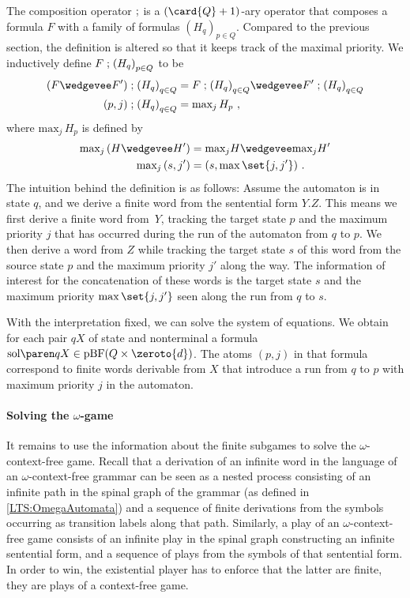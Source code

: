 \documentclass[../../diss.tex]{subfiles}
\begin{document}
The composition operator $\mathrel{;}$ is a $(\card{Q}+1)$-ary operator that composes a formula $F$ with a family of formulas ${(H_q)}_{p \in Q}$.
Compared to the previous section, the definition is altered so that it keeps track of the maximal priority.
We inductively define $F \mathrel{;} {(H_q)}_{p \in Q}$ to be
\begin{align*}
    (F \wedgevee F') \supercomp {(H_q)}_{q \in Q} &= F \supercomp {(H_q)}_{q \in Q} \wedgevee F' \supercomp {(H_q)}_{q \in Q}
    \\
    (p,j) \supercomp {(H_q)}_{q \in Q} &= \text{max}_j \, H_p
    \ ,
\end{align*}
where $\text{max}_j\, H_p$ is defined by
\begin{align*}
    \text{max}_j\, (H \wedgevee H') &= \text{max}_j H \wedgevee \text{max}_j H'
    \\
    \text{max}_j\, (s,j') &= (s,\max \set{j,j'})
    \ .
\end{align*}
The intuition behind the definition is as follows:
Assume the automaton is in state $q$, and we derive a finite word from the sentential form $Y.Z$.
This means we first derive a finite word from~$Y$, tracking the target state $p$ and the maximum priority $j$ that has occurred during the run of the automaton from $q$ to $p$.
We then derive a word from $Z$ while tracking the target state $s$ of this word from the source state $p$ and the maximum priority $j'$ along the way.
The information of interest for the concatenation of these words is the target state $s$ and the maximum priority $\max \set{j,j'}$ seen along the run from $q$ to $s$.

With the interpretation fixed, we can solve the system of equations.
We obtain for each pair $qX$ of state and nonterminal a formula $\sol{qX} \in \pBF(Q \times \zeroto{d})$.
The atoms $(p,j)$ in that formula correspond to finite words derivable from $X$ that introduce a run from $q$ to $p$ with maximum priority $j$ in the automaton.


\paragraph{Solving the $\omega$-game}

It remains to use the information about the finite subgames to solve the $\omega$-context-free game.
Recall that a derivation of an infinite word in the language of an $\omega$-context-free grammar can be seen as a nested process consisting of an infinite path in the spinal graph of the grammar (as defined in \cref{LTS:OmegaAutomata}) and a sequence of finite derivations from the symbols occurring as transition labels along that path.
Similarly, a play of an $\omega$-context-free game consists of an infinite play in the spinal graph constructing an infinite sentential form, and a sequence of plays from the symbols of that sentential form.
In order to win, the existential player has to enforce that the latter are finite, \ie they are plays of a context-free game.
\end{document}
